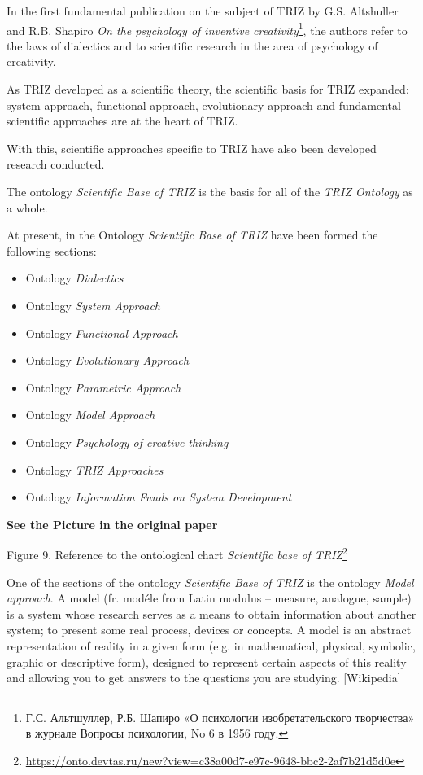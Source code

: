 \documentclass[11pt,a4paper]{article}
\newcommand{\addpicture}{\textbf{See the Picture in the original paper}\par}
\begin{document}
In the first fundamental publication on the subject of TRIZ by G.S. Altshuller
and R.B. Shapiro \emph{On the psychology of inventive
  creativity}\footnote{\foreignlanguage{russian}{Г.С. Альтшуллер, Р.Б. Шапиро
    «О психологии изобретательского творчества» в журнале Вопросы психологии,
    No 6 в 1956 году}.}, the authors refer to the laws of dialectics and to 
scientific research in the area of psychology of creativity.

As TRIZ developed as a scientific theory, the scientific basis for TRIZ
expanded: system approach, functional approach, evolutionary approach and
fundamental scientific approaches are at the heart of TRIZ.

With this, scientific approaches specific to TRIZ have also been developed
research conducted.

The ontology \emph{Scientific Base of TRIZ} is the basis for all of the
\emph{TRIZ Ontology} as a whole.

At present, in the Ontology \emph{Scientific Base of TRIZ} have been formed
the following sections:
\begin{itemize}[noitemsep]
\item Ontology \emph{Dialectics} 
\item Ontology \emph{System Approach} 
\item Ontology \emph{Functional Approach}
\item Ontology \emph{Evolutionary Approach}
\item Ontology \emph{Parametric Approach}
\item Ontology \emph{Model Approach}
\item Ontology \emph{Psychology of creative thinking}
\item Ontology \emph{TRIZ Approaches}
\item Ontology \emph{Information Funds on System Development}
\end{itemize}

\begin{center}
  \addpicture
  Figure 9. Reference to the ontological chart \emph{Scientific base of
    TRIZ}\footnote{\url{https://onto.devtas.ru/new?view=c38a00d7-e97c-9648-bbc2-2af7b21d5d0e}}
\end{center}

One of the sections of the ontology \emph{Scientific Base of TRIZ} is the
ontology \emph{Model approach}.  A model (fr. mod\'ele from Latin modulus --
measure, analogue, sample) is a system whose research serves as a means to
obtain information about another system; to present some real process, devices
or concepts.  A model is an abstract representation of reality in a given form
(e.g. in mathematical, physical, symbolic, graphic or descriptive form),
designed to represent certain aspects of this reality and allowing you to get
answers to the questions you are studying. [Wikipedia]
\end{document}
